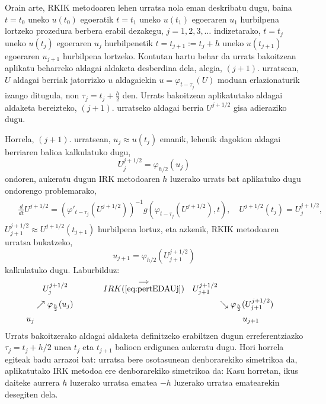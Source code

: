 Orain arte, RKIK metodoaren lehen urratsa nola eman deskribatu dugu, baina $t=t_0$ uneko $u(t_0)$ egoeratik $t=t_1$ uneko $u(t_1)$ egoeraren $u_1$ hurbilpena lortzeko prozedura berbera erabil dezakegu, $j=1,2,3,\ldots$ indizetarako, $t=t_{j}$ uneko $u(t_j)$ egoeraren $u_j$ hurbilpenetik $t=t_{j+1}:= t_{j}+h$ uneko $u(t_{j+1})$ egoeraren $u_{j+1}$ hurbilpena lortzeko. Kontutan hartu behar da urrats bakoitzean aplikatu beharreko aldagai aldaketa  desberdina dela, alegia, $(j+1)$. urratsean, $U$ aldagai berriak jatorrizko $u$ aldagaiekin $u = \varphi_{t-\tau_j}(U)$ moduan erlazionaturik izango ditugula, non $\tau_j = t_j + \frac{h}{2}$ den. Urrats bakoitzean aplikatutako aldagai aldaketa bereizteko, $(j+1)$. urratseko aldagai berria $U^{j+1/2}$ gisa adieraziko dugu.

 Horrela, $(j+1)$. urratsean, $u_j \approx u(t_j)$ emanik, lehenik dagokion aldagai berriaren balioa kalkulatuko dugu,
\begin{equation*}
U^{j+1/2}_j = \varphi_{h/2}(u_j)
\end{equation*}
%
ondoren, aukeratu dugun IRK metodoaren $h$ luzerako urrats bat aplikatuko dugu ondorengo problemarako,
\begin{align}
\begin{split}
\label{eq:pertEDAUj}
&\frac{d}{dt} U^{j+1/2} = \left(\varphi'_{t-\tau_j}(U^{j+1/2})\right)^{-1} g\left(\varphi_{t-\tau_j}(U^{j+1/2}),t \right), \quad U^{j+1/2}(t_j) = U^{j+1/2}_j,
\end{split}
\end{align}
%
$U^{j+1/2}_{j+1} \approx U^{j+1/2}(t_{j+1})$ hurbilpena lortuz, eta azkenik, RKIK metodoaren urratsa bukatzeko,
%
\begin{equation*}
u_{j+1} = \varphi_{h/2}(U^{j+1/2}_{j+1})
\end{equation*}
%
kalkulatuko dugu.  Laburbilduz:
%
\begin{align*}
   &   \quad U^{j+1/2}_j \quad \quad \quad \quad \stackrel{\Longrightarrow}{IRK(\ref{eq:pertEDAUj})}  & U^{j+1/2}_{j+1}&  &\\
  & \nearrow \varphi_{\frac{h}{2}}(u_j) &            & \searrow \varphi_{\frac{h}{2}}(U^{j+1/2}_{j+1})& \\
u_j &                  &    &\quad \quad \quad  u_{j+1}
\end{align*}
%
Urrats bakoitzerako aldagai aldaketa definitzeko erabiltzen dugun erreferentziazko $\tau_j=t_j+h/2$ unea $t_j$ eta $t_{j+1}$ balioen erdigunea aukeratu dugu. Hori horrela egiteak badu arrazoi bat: urratsa bere osotasunean denborarekiko simetrikoa da, aplikatutako IRK metodoa ere denborarekiko simetrikoa da: Kasu horretan, ikus daiteke aurrera $h$ luzerako urratsa ematea $-h$ luzerako urratsa ematearekin desegiten dela.





